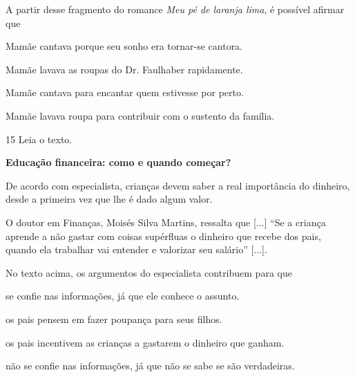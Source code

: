 A partir desse fragmento do romance \emph{Meu pé de laranja lima}, é
possível afirmar que

\begin{escolha}
\item Mamãe cantava porque seu sonho era tornar-se cantora.

\item Mamãe lavava as roupas do Dr. Faulhaber rapidamente.

\item Mamãe cantava para encantar quem estivesse por perto.

\item Mamãe lavava roupa para contribuir com o sustento da família.
\end{escolha}


\pagebreak
\num{15} Leia o texto.

\begin{myquote}
\textbf{Educação financeira: como e quando começar?}

De acordo com especialista, crianças devem saber a real importância do
dinheiro, desde a primeira vez que lhe é dado algum valor.

O doutor em Finanças, Moisés Silva Martins, ressalta que {[}...{]} ``Se
a criança aprende a não gastar com coisas supérfluas o dinheiro que
recebe dos pais, quando ela trabalhar vai entender e valorizar seu
salário'' {[}...{]}.

\end{myquote}

No texto acima, os argumentos do especialista contribuem para que

\begin{escolha}
\item se confie nas informações, já que ele conhece o assunto.

\item os pais pensem em fazer poupança para seus filhos.

\item os pais incentivem as crianças a gastarem o dinheiro que ganham.

\item não se confie nas informações, já que não se sabe se são verdadeiras.
\end{escolha}


